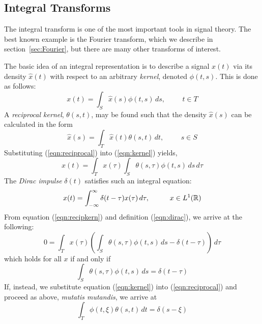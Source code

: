 {\subsection{Integral Transforms\protect\footnotemark}
}
The integral transform is one of the most important tools in signal theory.
The best known example is the Fourier transform, which we describe in
section~\ref{sec:Fourier}, but there are many other transforms of interest.

The basic idea of an integral representation is to describe a signal $x(t)$
via its density $\hat{x}(t)$ with respect to an arbitrary {\it kernel}, denoted
$\phi(t,s)$.  This is done as follows:
\begin{equation}
\label{eqn:kernel}
x(t) = \int_S \hat{x}(s) \phi(t,s) \,ds, \hspace{1cm} t\in T
\end{equation}
A {\it reciprocal kernel}, $\theta(s,t)$, may be found such that the density
$\hat{x}(s)$ can be calculated in the form
\begin{equation}
\label{eqn:reciprocal}
\hat{x}(s) = \int_T \hat{x}(t) \theta(s,t) \,dt, \hspace{1cm} s\in S
\end{equation}
Substituting (\ref{eqn:reciprocal}) into (\ref{eqn:kernel}) yields,
\begin{equation}
\label{eqn:recipkern}
x(t) =  \int_T x(\tau) \int_S \theta(s,\tau) \phi(t,s) \,ds\,d\tau
\end{equation}
The {\it Dirac impulse} $\delta(t)$ satisfies such an integral equation:
\begin{equation}
\label{eqn:dirac}
x(t) =  \int_{-\infty}^{\infty} \delta(t-\tau) x(\tau) \,d\tau, \hspace{1cm} x\in L^1(\mathbb{R})
\end{equation}
From equation (\ref{eqn:recipkern}) and definition (\ref{eqn:dirac}), we arrive
at the following:
\[
  0 = \int_T x(\tau) \left(\int_S \theta(s,\tau)\phi(t,s)\,ds -
      \delta(t-\tau)\right) \,d\tau 
\]
which holds for all $x$ if and only if 
\[
  \int_S \theta(s,\tau)\phi(t,s)\,ds = \delta(t-\tau)
\]
If, instead, we substitute equation (\ref{eqn:kernel}) into
(\ref{eqn:reciprocal}) and proceed as above, {\it mutatis mutandis}, 
we arrive at 
\[
\int_T \phi(t,\xi)\theta(s,t)\,dt = \delta(s-\xi)
\]
